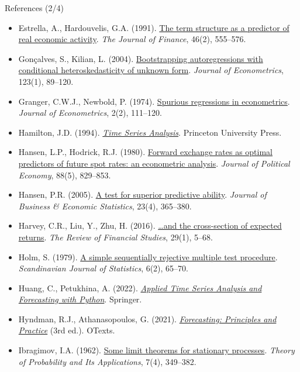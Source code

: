 \begin{frame}{References (2/4)}
\itemsize{\tiny}
\begin{itemize}
    \item Estrella, A., Hardouvelis, G.A. (1991). \href{https://doi.org/10.1111/j.1540-6261.1991.tb02674.x}{The term structure as a predictor of real economic activity}. \emph{The Journal of Finance}, 46(2), 555--576.
    \item Gonçalves, S., Kilian, L. (2004). \href{https://doi.org/10.1016/j.jeconom.2003.10.030}{Bootstrapping autoregressions with conditional heteroskedasticity of unknown form}. \emph{Journal of Econometrics}, 123(1), 89--120.
    \item Granger, C.W.J., Newbold, P. (1974). \href{https://doi.org/10.1016/0304-4076(74)90034-7}{Spurious regressions in econometrics}. \emph{Journal of Econometrics}, 2(2), 111--120.
    \item Hamilton, J.D. (1994). \href{https://doi.org/10.2307/j.ctv14jx6sm}{\emph{Time Series Analysis}}. Princeton University Press.
    \item Hansen, L.P., Hodrick, R.J. (1980). \href{https://doi.org/10.1086/260910}{Forward exchange rates as optimal predictors of future spot rates: an econometric analysis}. \emph{Journal of Political Economy}, 88(5), 829--853.
    \item Hansen, P.R. (2005). \href{https://doi.org/10.1198/073500105000000063}{A test for superior predictive ability}. \emph{Journal of Business \& Economic Statistics}, 23(4), 365--380.
    \item Harvey, C.R., Liu, Y., Zhu, H. (2016). \href{https://doi.org/10.1093/rfs/hhv059}{\ldots and the cross-section of expected returns}. \emph{The Review of Financial Studies}, 29(1), 5--68.
    \item Holm, S. (1979). \href{https://www.jstor.org/stable/4615733}{A simple sequentially rejective multiple test procedure}. \emph{Scandinavian Journal of Statistics}, 6(2), 65--70.
    \item Huang, C., Petukhina, A. (2022). \href{https://doi.org/10.1007/978-3-031-13584-2}{\emph{Applied Time Series Analysis and Forecasting with Python}}. Springer.
    \item Hyndman, R.J., Athanasopoulos, G. (2021). \href{https://otexts.com/fpp3/}{\emph{Forecasting: Principles and Practice}} (3rd ed.). OTexts.
    \item Ibragimov, I.A. (1962). \href{https://doi.org/10.1137/1107036}{Some limit theorems for stationary processes}. \emph{Theory of Probability and Its Applications}, 7(4), 349--382.

\end{itemize}
\end{frame}
